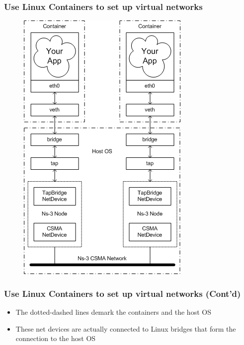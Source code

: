 \documentclass{../iot-lecture}
\begin{document}
\begin{frame}
  \frametitle{Use Linux Containers to set up virtual networks}
  \begin{figure}
    \includegraphics[height=.8\textheight]{./img/container_and_ns3_bd.png}
  \end{figure}
\end{frame}

\begin{frame}
  \frametitle{Use Linux Containers to set up virtual networks (Cont'd)}
  \begin{itemize}
    \item The dotted-dashed lines demark the containers and the host OS
    \item These net devices are actually connected to Linux bridges that form the connection to the host OS
  \end{itemize}
\end{frame}
\end{document}
